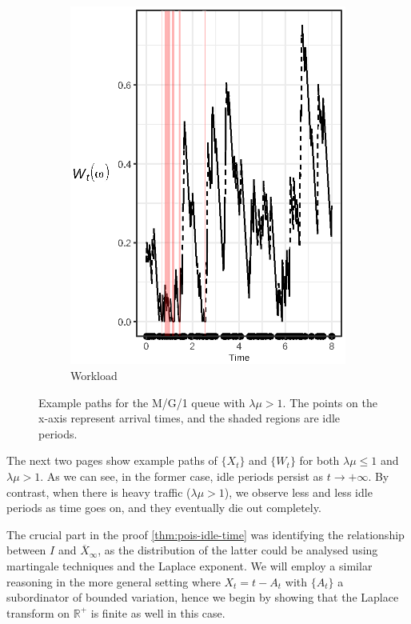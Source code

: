 \documentclass[titlepage]{article}
\theoremstyle{plain}
\theoremstyle{definition}
\begin{document}
{\begin{landscape}
\begin{figure}
\begin{subfigure}{0.45\linewidth}
        \includegraphics{workload_ge_1}
        \caption{Workload}
      \end{subfigure}
      \caption{Example paths for the M/G/1 queue with $\lambda \mu > 1$. The points on the x-axis represent arrival times, and the shaded regions are idle periods.}
      \label{fig:example-ge-1}
    \end{figure}
  \end{landscape}
}

The next two pages show example paths of $\{ X_t \}$ and $\{ W_t \}$ for both $\lambda \mu \leq 1$ and $\lambda \mu > 1$. As we can see, in the former case, idle periods persist as $t \to +\infty$. By contrast, when there is heavy traffic ($\lambda \mu > 1$), we observe less and less idle periods as time goes on, and they eventually die out completely.

The crucial part in the proof \cref{thm:pois-idle-time} was identifying the relationship between $I$ and $\overline{X}_\infty$, as the distribution of the latter could be analysed using martingale techniques and the Laplace exponent. We will employ a similar reasoning in the more general setting where $X_t = t - A_t$ with $\{ A_t \}$ a subordinator of bounded variation, hence we begin by showing that the Laplace transform on $\mathbb{R}^+$ is finite as well in this case.
\end{document}
